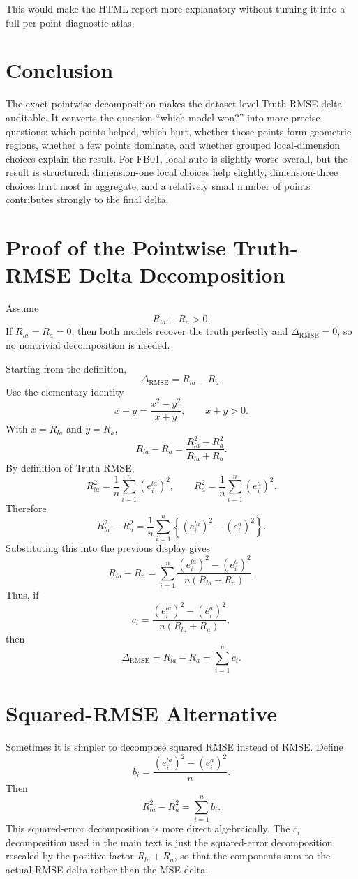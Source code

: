 \documentclass[11pt]{article}
\begin{document}
This would make the HTML report more explanatory without turning it into a full
per-point diagnostic atlas.

\section*{Conclusion}

The exact pointwise decomposition makes the dataset-level Truth-RMSE delta
auditable.  It converts the question ``which model won?'' into more precise
questions: which points helped, which hurt, whether those points form geometric
regions, whether a few points dominate, and whether grouped local-dimension
choices explain the result.  For FB01, local-auto is slightly worse overall,
but the result is structured: dimension-one local choices help slightly,
dimension-three choices hurt most in aggregate, and a relatively small number
of points contributes strongly to the final delta.

\appendix
\section{Proof of the Pointwise Truth-RMSE Delta Decomposition}

Assume
\[
  R_{la}+R_a>0.
\]
If \(R_{la}=R_a=0\), then both models recover the truth perfectly and
\(\Delta_{\mathrm{RMSE}}=0\), so no nontrivial decomposition is needed.

Starting from the definition,
\[
  \Delta_{\mathrm{RMSE}}
  =
  R_{la}-R_a.
\]
Use the elementary identity
\[
  x-y=\frac{x^2-y^2}{x+y},
  \qquad x+y>0.
\]
With \(x=R_{la}\) and \(y=R_a\),
\[
  R_{la}-R_a
  =
  \frac{R_{la}^2-R_a^2}{R_{la}+R_a}.
\]
By definition of Truth RMSE,
\[
  R_{la}^2
  =
  \frac{1}{n}
  \sum_{i=1}^{n}
  (e_i^{la})^2,
  \qquad
  R_a^2
  =
  \frac{1}{n}
  \sum_{i=1}^{n}
  (e_i^a)^2.
\]
Therefore
\[
  R_{la}^2-R_a^2
  =
  \frac{1}{n}
  \sum_{i=1}^{n}
  \left\{
    (e_i^{la})^2-(e_i^a)^2
  \right\}.
\]
Substituting this into the previous display gives
\[
  R_{la}-R_a
  =
  \sum_{i=1}^{n}
  \frac{
    (e_i^{la})^2-(e_i^a)^2
  }{
    n(R_{la}+R_a)
  }.
\]
Thus, if
\[
  c_i
  =
  \frac{
    (e_i^{la})^2-(e_i^a)^2
  }{
    n(R_{la}+R_a)
  },
\]
then
\[
  \Delta_{\mathrm{RMSE}}
  =
  R_{la}-R_a
  =
  \sum_{i=1}^{n} c_i.
\]

\section{Squared-RMSE Alternative}

Sometimes it is simpler to decompose squared RMSE instead of RMSE.  Define
\[
  b_i
  =
  \frac{(e_i^{la})^2-(e_i^a)^2}{n}.
\]
Then
\[
  R_{la}^2-R_a^2
  =
  \sum_{i=1}^{n} b_i.
\]
This squared-error decomposition is more direct algebraically.  The \(c_i\)
decomposition used in the main text is just the squared-error decomposition
rescaled by the positive factor \(R_{la}+R_a\), so that the components sum to
the actual RMSE delta rather than the MSE delta.
\end{document}
